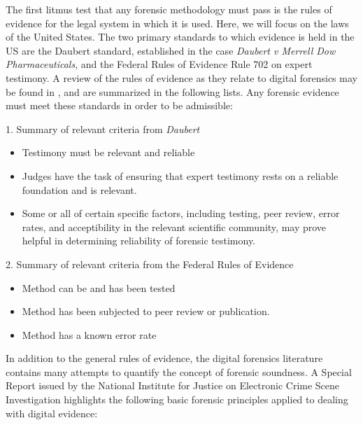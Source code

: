 The first litmus test that any forensic methodology must pass is the rules of evidence for the legal system in which it is used. Here, we will
focus on the laws of the United States. The two primary standards to which evidence is held in the US are the Daubert standard, established
in the case \emph{Daubert v Merrell Dow Pharmaceuticals}\cite{Daubert1993}, and the Federal Rules of Evidence Rule 702 on expert testimony\cite{FedRules702}. 
A review of the rules of evidence as they relate to 
digital forensics may be found in \cite{meyers2005}, and are summarized in the following lists. Any forensic
evidence must meet these standards in order to be admissible:


\begin{center}
1. Summary of relevant criteria from \emph{Daubert}
\end{center}
\begin{itemize}
  \item Testimony must be relevant and reliable
  \item Judges have the task of ensuring that expert testimony rests on a reliable
        foundation and is relevant.
  \item Some or all of certain specific factors, including testing, peer review, error
        rates, and acceptibility in the relevant scientific community, may prove helpful
        in determining reliability of forensic testimony.
\end{itemize}

\newpage

\begin{center}
 2. Summary of relevant criteria from the Federal Rules of Evidence
\begin{itemize}
  \item Method can be and has been tested
  \item Method has been subjected to peer review or publication.
  \item Method has a known error rate
\end{itemize}

\end{center}


In addition to the general rules of evidence, the digital forensics literature contains many attempts to quantify the concept of forensic soundness.
A Special Report issued by the National Institute for Justice on Electronic Crime Scene Investigation \cite{NIJ2008} highlights the following basic forensic 
principles applied to dealing with digital evidence:

